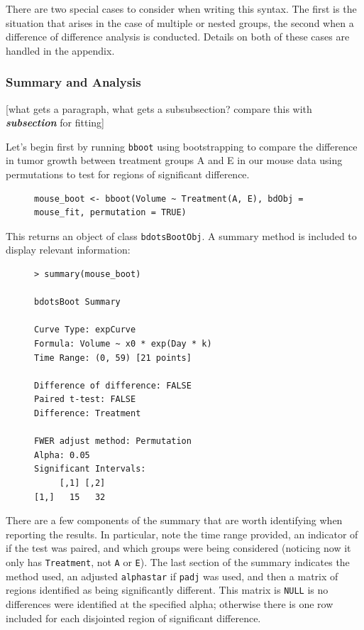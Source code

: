 \documentclass{article}
\newcommand{\xt}{\texttt}%
\begin{document}
There are two special cases to consider when writing this syntax. The first is the situation that arises in the case of multiple or nested groups, the second when a difference of difference analysis is conducted. Details on both of these cases are handled in the appendix. 



\subsubsection{Summary and Analysis}

[what gets a paragraph, what gets a subsubsection?  compare this with \textit{\textbf{subsection}} for fitting]

Let's begin first by running \xt{bboot} using bootstrapping to compare the difference in tumor growth between treatment groups A and E in our mouse data using permutations to test for regions of significant difference. 

\begin{singlespace}
\begin{figure}[H]
\centering
\begin{BVerbatim}
mouse_boot <- bboot(Volume ~ Treatment(A, E), bdObj = mouse_fit, permutation = TRUE)
\end{BVerbatim}
\end{figure}
\end{singlespace}


This returns an object of class \xt{bdotsBootObj}. A summary method is included to display relevant information:

\begin{singlespace}
\begin{figure}[H]
\centering
\begin{BVerbatim}
> summary(mouse_boot)

bdotsBoot Summary

Curve Type: expCurve 
Formula: Volume ~ x0 * exp(Day * k) 
Time Range: (0, 59) [21 points]

Difference of difference: FALSE 
Paired t-test: FALSE 
Difference: Treatment 

FWER adjust method: Permutation 
Alpha: 0.05 
Significant Intervals:
     [,1] [,2]
[1,]   15   32
\end{BVerbatim}
\end{figure}
\end{singlespace}

There are a few components of the summary that are worth identifying when reporting the results. In particular, note the time range provided, an indicator of if the test was paired, and which groups were being considered (noticing now it only has \xt{Treatment}, not \xt{A} or \xt{E}). The last section of the summary indicates the method used, an adjusted \xt{alphastar} if \xt{padj} was used, and then a matrix of regions identified as being significantly different. This matrix is \xt{NULL} is no differences were identified at the specified alpha; otherwise there is one row included for each disjointed region of significant difference.
\end{document}
